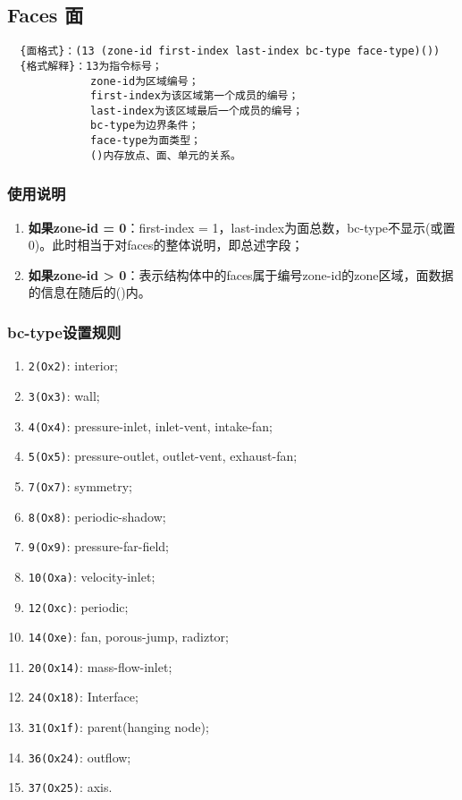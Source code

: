 \documentclass[lang=cn,11pt,a4paper]{elegantpaper}
\begin{document}
\subsection{Faces 面}\label{Faces}
\begin{lstlisting}
  {面格式}：(13 (zone-id first-index last-index bc-type face-type)())
  {格式解释}：13为指令标号；
             zone-id为区域编号；
             first-index为该区域第一个成员的编号；
             last-index为该区域最后一个成员的编号；
             bc-type为边界条件；
             face-type为面类型；
             ()内存放点、面、单元的关系。
\end{lstlisting}

\subsubsection{使用说明}
\begin{enumerate}
  \item \textbf{如果zone-id = 0}：first-index = 1，last-index为面总数，bc-type不显示(或置0)。此时相当于对faces的整体说明，即总述字段；
  \item \textbf{如果zone-id > 0}：表示结构体中的faces属于编号zone-id的zone区域，面数据的信息在随后的()内。
\end{enumerate}

\subsubsection{bc-type设置规则}\label{bc-type}
\begin{enumerate}[label=\arabic*).]
  \item \lstinline{2(Ox2)}: interior;
  \item \lstinline{3(Ox3)}: wall;
  \item \lstinline{4(Ox4)}: pressure-inlet, inlet-vent, intake-fan;
  \item \lstinline{5(Ox5)}: pressure-outlet, outlet-vent, exhaust-fan;
  \item \lstinline{7(Ox7)}: symmetry;
  \item \lstinline{8(Ox8)}: periodic-shadow;
  \item \lstinline{9(Ox9)}: pressure-far-field;
  \item \lstinline{10(Oxa)}: velocity-inlet;
  \item \lstinline{12(Oxc)}: periodic; 
  \item \lstinline{14(Oxe)}: fan, porous-jump, radiztor;
  \item \lstinline{20(Ox14)}: mass-flow-inlet;
  \item \lstinline{24(Ox18)}: Interface;
  \item \lstinline{31(Ox1f)}: parent(hanging node);
  \item \lstinline{36(Ox24)}: outflow;
  \item \lstinline{37(Ox25)}: axis.
\end{enumerate}
\end{document}
